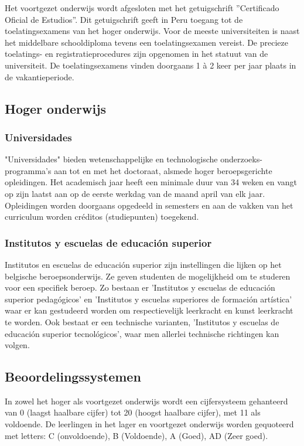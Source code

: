 Het voortgezet onderwijs wordt afgesloten met het getuigschrift ''Certificado Oficial de Estudios''. Dit getuigschrift geeft in Peru toegang tot de toelatingsexamens van het hoger onderwijs. Voor de meeste universiteiten is naast het middelbare schooldiploma tevens een toelatingsexamen vereist. De precieze toelatings- en registratieprocedures zijn opgenomen in het statuut van de universiteit. De toelatingsexamens vinden doorgaans 1 à 2 keer per jaar plaats in de vakantieperiode. \autocite{Nuffic2015}

\subsection{Hoger onderwijs}
\subsubsection{Universidades}
 "Universidades" bieden wetenschappelijke en technologische onderzoeks-programma’s aan tot en met het doctoraat, alsmede hoger beroepsgerichte opleidingen. Het academisch jaar heeft een minimale duur van 34 weken en vangt op zijn laatst aan op de eerste werkdag van de maand april van elk jaar. Opleidingen worden doorgaans opgedeeld in semesters en aan de vakken van het curriculum worden créditos (studiepunten) toegekend. \autocite{Nuffic2015}
 
 \subsubsection{Institutos y escuelas de educación superior }
Institutos en escuelas de educación superior zijn instellingen die lijken op het belgische beroepsonderwijs. Ze geven studenten de mogelijkheid om te studeren voor een specifiek beroep. Zo bestaan er 'Institutos y escuelas de educación superior pedagógicos' en 'Institutos y escuelas superiores de formación artística' waar er kan gestudeerd worden om respectievelijk leerkracht en kunst leerkracht te worden. Ook bestaat er een technische varianten, 'Institutos y escuelas de educación superior tecnológicos', waar men allerlei technische richtingen kan volgen. \autocite{Nuffic2015}


\subsection{Beoordelingssystemen}
In zowel het hoger als voortgezet onderwijs wordt een cijfersysteem gehanteerd van 0 (laagst haalbare cijfer) tot 20 (hoogst haalbare cijfer), met 11 als voldoende. De leerlingen in het lager en voortgezet onderwijs worden gequoteerd met letters: C (onvoldoende), B (Voldoende), A (Goed), AD (Zeer goed). \autocite{Nuffic2015}


